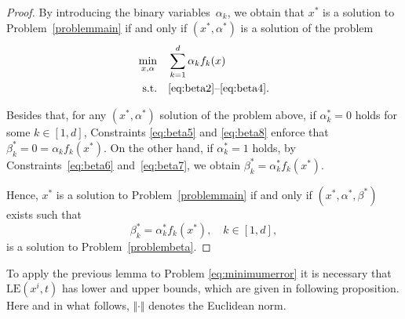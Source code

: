 \documentclass[a4paper,american,reqno]{amsart}
\newcommand{\st}{\text{s.t.}}
\newcommand{\LE}{\text{LE}}
\begin{document}
\begin{proof}
  By introducing the binary variables~$\alpha_k$, we obtain that $x^*$
  is a solution to Problem~\eqref{problemmain} if and only if $(x^*,
  \alpha^*)$ is a solution of the problem
  \begin{align*}
    \min_{ x,  \alpha  } \quad
    & \sum_{k =1}^d  \alpha_k f_k(x)
    \\
    \st \quad
    &  \eqref{eq:beta2}\text{--}\eqref{eq:beta4}.
  \end{align*}

  Besides that, for any $(x^*, \alpha^*)$ solution of the problem
  above, if $\alpha_k^* = 0$ holds for some $k\in [1,d]$, Constraints
  \eqref{eq:beta5} and \eqref{eq:beta8} enforce that $\beta^*_k = 0 =
  \alpha_k f_k(x^*)$. On the other hand, if $\alpha_k^*=1$ holds, by
  Constraints~\eqref{eq:beta6} and~\eqref{eq:beta7}, we obtain
  $\beta_k^* = \alpha^*_k f_k(x^*)$.

  Hence, $x^*$ is a solution to Problem~\eqref{problemmain} if and
  only if $(x^*, \alpha^*,\beta^*)$ exists such that
  \begin{equation*}
    \beta^*_k = \alpha^*_k f_k(x^*), \quad k \in [1,d],
  \end{equation*}
  is a solution to Problem~\eqref{problembeta}.
\end{proof}

To apply the previous lemma to Problem \eqref{eq:minimumerror} it is
necessary that $\LE(x^i, t)$ has lower and upper bounds, which are
given in following proposition.
Here and in what follows, $\Vert \cdot \Vert$ denotes the Euclidean
norm.
\end{document}
